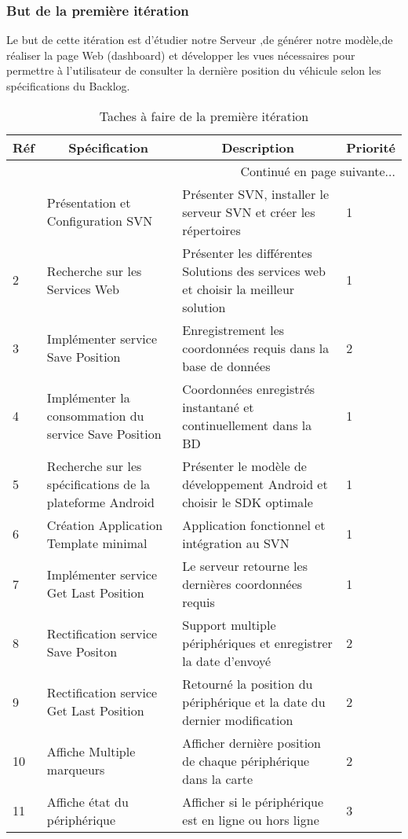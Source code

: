 \subsubsection{But de la première itération}

Le but de cette itération est d'étudier notre Serveur ,de générer notre modèle,de réaliser
la page Web (dashboard) et développer les vues nécessaires pour permettre à l'utilisateur
de consulter la dernière position du véhicule selon les spécifications du Backlog.

\begin{center}
    \footnotesize
    \begin{longtable}{| p{1cm} | p{5cm} | p{7cm} | p{1cm} |}
        \caption{Taches à faire de la première itération}
        \label{tab:sprint1-backlog} \\

 \hline
 \multicolumn{1}{|c}{\textbf{Réf}} &
 \multicolumn{1}{|c}{\textbf{Spécification}} &
 \multicolumn{1}{|c}{\textbf{Description}} &
 \multicolumn{1}{|c|}{\textbf{Priorité}} \\ \hline
 \endhead

 \hline \multicolumn{4}{|r|}{{Continué en page suivante$\dotsc$}} \\ \hline
 \endfoot

 \hline \hline
 \endlastfoot

\hline
1 & Présentation et Configuration SVN & Présenter SVN, installer le serveur SVN et créer les répertoires  & 1 \\ \hline
2 & Recherche sur les Services Web & Présenter les différentes Solutions des services web et choisir la meilleur solution & 1 \\ \hline
3 & Implémenter service Save Position & Enregistrement les coordonnées requis dans la base de données & 2 \\ \hline
4 & Implémenter la consommation du service Save Position & Coordonnées enregistrés instantané et continuellement dans la BD & 1 \\ \hline
5 & Recherche sur les spécifications de la plateforme Android & Présenter le modèle de développement Android et choisir le SDK optimale & 1 \\ \hline
6 & Création Application Template minimal & Application fonctionnel et intégration au SVN & 1 \\ \hline
7 & Implémenter service Get Last Position & Le serveur retourne les dernières coordonnées requis & 1 \\ \hline
8 & Rectification service Save Positon & Support multiple périphériques et enregistrer la date d'envoyé & 2 \\ \hline
9 & Rectification service Get Last Position & Retourné la position du périphérique et la date du dernier modification & 2 \\ \hline
10 & Affiche Multiple marqueurs & Afficher dernière position de chaque périphérique dans la carte & 2 \\ \hline
11 & Affiche état du périphérique & Afficher si le périphérique est en ligne ou hors ligne & 3 \\ \hline
\end{longtable}
\end{center}

